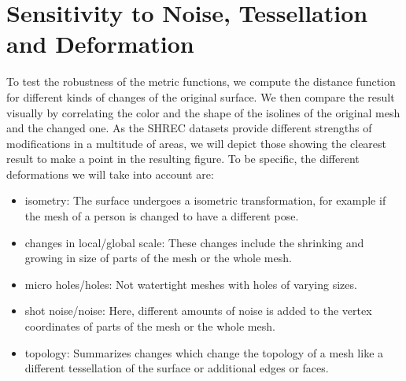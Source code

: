 \section{Sensitivity to Noise, Tessellation and Deformation}
To test the robustness of the metric functions, we compute the distance function for different kinds of changes of the original surface.
We then compare the result visually by correlating the color and the shape of the isolines of the original mesh and the changed one.
As the SHREC datasets provide different strengths of modifications in a multitude of areas, we will depict those showing the clearest result to make a point in the resulting figure.
To be specific, the different deformations we will take into account are:
\begin{itemize}
	\item isometry: The surface undergoes a isometric transformation, for example if the mesh of a person is changed to have a different pose.
	\item changes in local/global scale: These changes include the shrinking and growing in size of parts of the mesh or the whole mesh.
	\item micro holes/holes: Not watertight meshes with holes of varying sizes.
	\item shot noise/noise: Here, different amounts of noise is added to the vertex coordinates of parts of the mesh or the whole mesh.
	\item topology: Summarizes changes which change the topology of a mesh like a different tessellation of the surface or  additional edges or faces.
\end{itemize}

